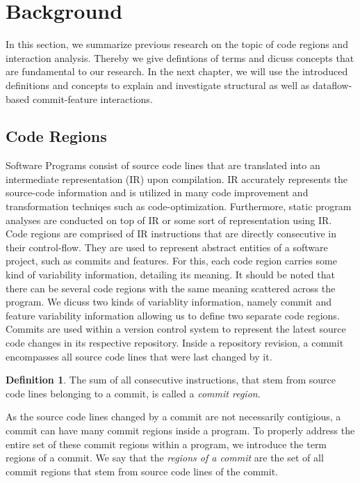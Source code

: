 \section*{Background}\label{ch:background}

In this section, we summarize previous research on the topic of code regions and interaction analysis.
Thereby we give defintions of terms and dicuss concepts that are fundamental to our research.
In the next chapter, we will use the introduced definitions and concepts to explain and investigate structural as well as dataflow-based commit-feature interactions.

\subsection*{Code Regions}\label{ch:code_regions}
Software Programs consist of source code lines that are translated into an intermediate representation (IR) upon compilation.
IR accurately represents the source-code information and is utilized in many code improvement and transformation techniqes such as code-optimization.
Furthermore, static program analyses are conducted on top of IR or some sort of representation using IR. 
Code regions are comprised of IR instructions that are directly consecutive in their control-flow. 
They are used to represent abstract entities of a software project, such as commits and features.
For this, each code region carries some kind of variability information, detailing its meaning.
It should be noted that there can be several code regions with the same meaning scattered across the program.
We dicuss two kinds of variablity information, namely commit and feature variability information allowing us to define two separate code regions. \\
Commits are used within a version control system to represent the latest source code changes in its respective repository.
Inside a repository revision, a commit encompasses all source code lines that were last changed by it. 

\theoremstyle{definition}
\newtheorem{definition}{Definition}
\begin{definition}\label{def:commit_regions}
	The sum of all consecutive instructions, that stem from source code lines belonging to a commit, is called a \emph{commit region}.
\end{definition}

As the source code lines changed by a commit are not necessarily contigious,
a commit can have many commit regions inside a program. 
To properly address the entire set of these commit regions within a program, we introduce the term regions of a commit.
We say that the \emph{regions of a commit} are the set of all commit regions that stem from source code lines of the commit. \\

